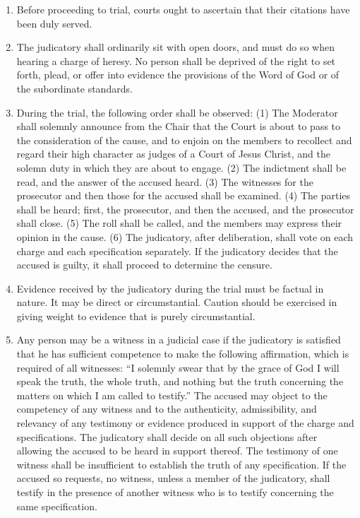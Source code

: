 \documentclass[
]{book}
\begin{document}
\begin{enumerate}
\item
  Before proceeding to trial, courts ought to ascertain that their citations have been duly served.
\item
  The judicatory shall ordinarily sit with open doors, and must do so when hearing a charge of heresy. No person shall be deprived of the right to set forth, plead, or offer into evidence the provisions of the Word of God or of the subordinate standards.
\item
  During the trial, the following order shall be observed: (1) The Moderator shall solemnly announce from the Chair that the Court is about to pass to the consideration of the cause, and to enjoin on the members to recollect and regard their high character as judges of a Court of Jesus Christ, and the solemn duty in which they are about to engage. (2) The indictment shall be read, and the answer of the accused heard. (3) The witnesses for the prosecutor and then those for the accused shall be examined. (4) The parties shall be heard; first, the prosecutor, and then the accused, and the prosecutor shall close. (5) The roll shall be called, and the members may express their opinion in the cause. (6) The judicatory, after deliberation, shall vote on each charge and each specification separately. If the judicatory decides that the accused is guilty, it shall proceed to determine the censure.
\item
  Evidence received by the judicatory during the trial must be factual in nature. It may be direct or circumstantial. Caution should be exercised in giving weight to evidence that is purely circumstantial.
\item
  Any person may be a witness in a judicial case if the judicatory is satisfied that he has sufficient competence to make the following affirmation, which is required of all witnesses: ``I solemnly swear that by the grace of God I will speak the truth, the whole truth, and nothing but the truth concerning the matters on which I am called to testify.'' The accused may object to the competency of any witness and to the authenticity, admissibility, and relevancy of any testimony or evidence produced in support of the charge and specifications. The judicatory shall decide on all such objections after allowing the accused to be heard in support thereof. The testimony of one witness shall be insufficient to establish the truth of any specification. If the accused so requests, no witness, unless a member of the judicatory, shall testify in the presence of another witness who is to testify concerning the same specification.

\end{enumerate}
\end{document}
